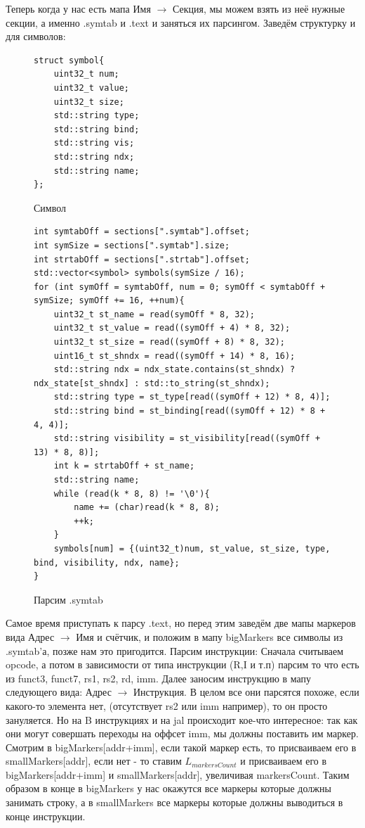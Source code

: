 \documentclass{article}
\begin{document}
Теперь когда у нас есть мапа Имя $\rightarrow$ Секция, мы можем взять из неё нужные секции, а именно .symtab и .text и заняться их парсингом.
Заведём структурку и для символов:
\begin{figure}[H]
	\begin{lstlisting}
struct symbol{
	uint32_t num;
	uint32_t value;
	uint32_t size;
	std::string type;
	std::string bind;
	std::string vis;
	std::string ndx;
	std::string name;
};
	\end{lstlisting}
	\caption{Символ}
\end{figure}
\begin{figure}[H]
	\begin{lstlisting}
int symtabOff = sections[".symtab"].offset;
int symSize = sections[".symtab"].size;
int strtabOff = sections[".strtab"].offset;
std::vector<symbol> symbols(symSize / 16);
for (int symOff = symtabOff, num = 0; symOff < symtabOff + symSize; symOff += 16, ++num){
	uint32_t st_name = read(symOff * 8, 32);
	uint32_t st_value = read((symOff + 4) * 8, 32);
	uint32_t st_size = read((symOff + 8) * 8, 32);
	uint16_t st_shndx = read((symOff + 14) * 8, 16);
	std::string ndx = ndx_state.contains(st_shndx) ? ndx_state[st_shndx] : std::to_string(st_shndx);
	std::string type = st_type[read((symOff + 12) * 8, 4)];
	std::string bind = st_binding[read((symOff + 12) * 8 + 4, 4)];
	std::string visibility = st_visibility[read((symOff + 13) * 8, 8)];
	int k = strtabOff + st_name;
	std::string name;
	while (read(k * 8, 8) != '\0'){
		name += (char)read(k * 8, 8);
		++k;
	}
	symbols[num] = {(uint32_t)num, st_value, st_size, type, bind, visibility, ndx, name};
}
	\end{lstlisting}
	\caption{Парсим .symtab}
\end{figure}
	Самое время приступать к парсу .text, но перед этим заведём две мапы маркеров вида Адрес $\rightarrow$ Имя и счётчик, и положим в мапу bigMarkers все символы из .symtab'а, позже нам это пригодится. Парсим инструкции: Сначала считываем opcode, а потом в зависимости от типа инструкции (R,I и т.п) парсим то что есть из funct3, funct7, rs1, rs2, rd, imm. Далее заносим инструкцию в мапу следующего вида: Адрес $\rightarrow$ Инструкция. В целом все они парсятся похоже, если какого-то элемента нет, (отсутствует rs2 или imm например), то он просто зануляется. Но на B инструкциях и на jal происходит кое-что интересное: так как они могут совершать переходы на оффсет imm, мы должны поставить им маркер. Смотрим в bigMarkers[addr+imm], если такой маркер есть, то присваиваем его в smallMarkers[addr], если нет - то ставим $L_{markersCount}$ и присваиваем его в bigMarkers[addr+imm] и smallMarkers[addr], увеличивая markersCount. Таким образом в конце в bigMarkers у нас окажутся все маркеры которые должны занимать строку, а в smallMarkers все маркеры которые должны выводиться в конце инструкции.
\end{document}
